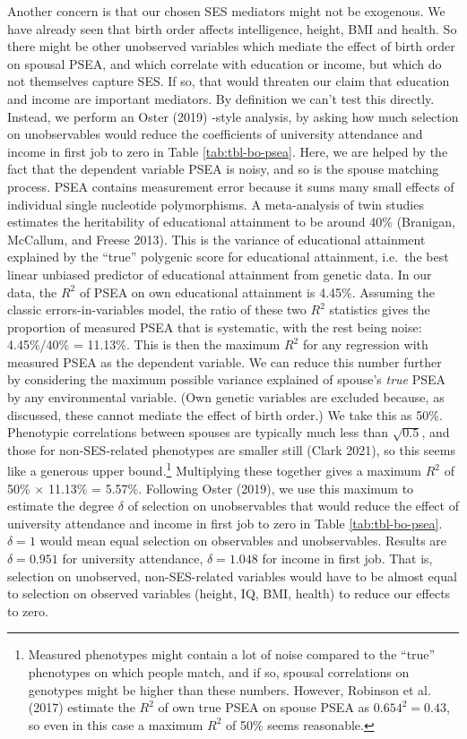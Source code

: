 \documentclass[
]{article}
\theoremstyle{definition}
\theoremstyle{definition}
\theoremstyle{definition}
\theoremstyle{definition}
\theoremstyle{remark}
\begin{document}
Another concern is that our chosen SES mediators might not be exogenous. We have
already seen that birth order affects intelligence, height, BMI
and health. So there might be other unobserved variables which mediate the effect
of birth order on spousal PSEA, and which correlate with education or income,
but which do not themselves capture SES. If so, that would threaten our claim that
education and income are important mediators. By definition we can't test this
directly. Instead, we perform an Oster (2019) -style analysis, by asking
how much selection on unobservables would reduce the coefficients of university
attendance and income in first job to zero in Table \ref{tab:tbl-bo-psea}. Here,
we are helped by the fact that the dependent variable PSEA is noisy, and so is the
spouse matching process. PSEA contains measurement error because it sums many
small effects of individual single nucleotide polymorphisms. A meta-analysis of
twin studies estimates the heritability of educational attainment to be around 40\%
(Branigan, McCallum, and Freese 2013). This is the variance of educational attainment
explained by the ``true'' polygenic score for educational attainment, i.e.~the
best linear unbiased predictor of educational attainment from genetic data. In
our data, the \(R^2\) of PSEA on own educational attainment is
4.45\%. Assuming the classic errors-in-variables model,
the ratio of these two \(R^2\) statistics gives the proportion of measured PSEA
that is systematic, with the rest being noise: 4.45\%/40\%
= 11.13\%. This is then the maximum \(R^2\) for
any regression with measured PSEA as the dependent variable. We can reduce this
number further by considering the maximum possible variance explained of spouse's
\emph{true} PSEA by any environmental variable. (Own genetic variables are excluded
because, as discussed, these cannot mediate the effect of birth order.) We take
this as 50\%. Phenotypic correlations between spouses
are typically much less than \(\sqrt{0.5}\), and those for non-SES-related
phenotypes are smaller still (Clark 2021), so this seems like a generous
upper bound.\footnote{Measured phenotypes might contain a lot of noise compared to the
  ``true'' phenotypes on which people match, and if so, spousal correlations on
  genotypes might be higher than these numbers. However, Robinson et al. (2017) estimate
  the \(R^2\) of own true PSEA on spouse PSEA as \(0.654^2 = 0.43\), so even in this
  case a maximum \(R^2\) of 50\% seems reasonable.} Multiplying these together gives a maximum \(R^2\) of
50\% \(\times\) 11.13\%
= 5.57\%. Following Oster (2019), we use this
maximum to estimate the degree \(\delta\) of selection on unobservables that would
reduce the effect of university attendance and income in first job to zero in
Table \ref{tab:tbl-bo-psea}. \(\delta = 1\) would mean equal selection on
observables and unobservables. Results are \(\delta = 0.951\) for
university attendance, \(\delta = 1.048\) for income in first job. That
is, selection on unobserved, non-SES-related variables would have to be almost
equal to selection on observed variables (height, IQ, BMI, health) to reduce our
effects to zero.
\end{document}
